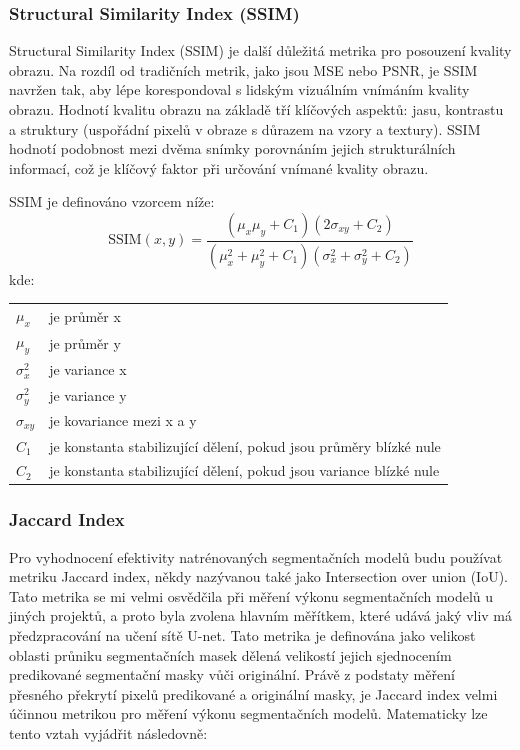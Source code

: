 \documentclass[male,czech,api_ing]{thesis}
\makeatletter
\newenvironment{conditions}[1][kde:]
    {#1 \begin{tabular}[t]{>{$}l<{$} @{${}={}$} >{\raggedright\arraybackslash}p{10cm}}}
    {\end{tabular}}
\makeatother
\begin{document}
\subsubsection{Structural Similarity Index (SSIM)}
Structural Similarity Index (SSIM) je další důležitá metrika pro posouzení kvality obrazu. Na rozdíl od tradičních metrik, jako jsou MSE nebo PSNR, je SSIM navržen tak, aby lépe korespondoval s lidským vizuálním vnímáním kvality obrazu. Hodnotí kvalitu obrazu na základě tří klíčových aspektů: jasu, kontrastu a struktury (uspořádní pixelů v obraze s důrazem na vzory a textury). SSIM hodnotí podobnost mezi dvěma snímky porovnáním jejich strukturálních informací, což je klíčový faktor při určování vnímané kvality obrazu. \cite{PSNRSSIM}

SSIM je definováno vzorcem níže:
\begin{equation}
    \text{SSIM}(x, y) = \frac{(\mu_x \mu_y + C_1)(2\sigma_{xy} + C_2)}{(\mu_x^2 + \mu_y^2 + C_1)(\sigma_x^2 + \sigma_y^2 + C_2)}
\end{equation}
\begin{conditions}
    \mu_x &  je průměr x \\
    \mu_y &  je průměr y \\
    \sigma_x^2 &  je variance x \\
    \sigma_y^2 &  je variance y \\
    \sigma_{xy} &  je kovariance mezi x a y \\
    C_1 &  je konstanta stabilizující dělení, pokud jsou průměry blízké nule \\
    C_2 &  je konstanta stabilizující dělení, pokud jsou variance blízké nule
\end{conditions}

\subsubsection{Jaccard Index}
Pro vyhodnocení efektivity natrénovaných segmentačních modelů budu používat metriku Jaccard index, někdy nazývanou také jako Intersection over union (IoU). Tato metrika se mi velmi osvědčila při měření výkonu segmentačních modelů u jiných projektů, a proto byla zvolena hlavním měřítkem, které udává jaký vliv má předzpracování na učení sítě U-net. Tato metrika je definována jako velikost oblasti průniku segmentačních masek dělená velikostí jejich sjednocením predikované segmentační masky vůči originální. Právě z podstaty měření přesného překrytí pixelů predikované a originální masky, je Jaccard index velmi účinnou metrikou pro měření výkonu segmentačních modelů. Matematicky lze tento vztah vyjádřit následovně:
\end{document}
